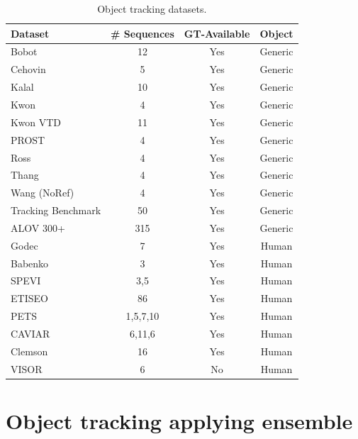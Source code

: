 \begin{table}[t!]
\centering
\begin{tabular}{lccc}
\toprule
\textbf{Dataset} & \textbf{\# Sequences} & \textbf{GT-Available} &
\textbf{Object} \\ \midrule
Bobot \cite{KleinIROS10}          & 12       & Yes & Generic \\
Cehovin \cite{Cehovin2013}        & 5        & Yes & Generic \\
Kalal \cite{Kalal2011}            & 10       & Yes & Generic \\
Kwon \cite{KwonL09}               & 4        & Yes & Generic \\
Kwon VTD \cite{KwonL10}           & 11       & Yes & Generic \\
PROST \cite{Santner2010a}         & 4        & Yes & Generic \\
Ross \cite{Ross2007}              & 4        & Yes & Generic \\
Thang \cite{Dinh2011}             & 4        & Yes & Generic \\
Wang (NoRef)                      & 4        & Yes & Generic \\
Tracking Benchmark \cite{Wu2013b} & 50       & Yes & Generic \\
ALOV 300+ \cite{Smeulders2014}    & 315      & Yes & Generic \\
Godec \cite{godec11a}             & 7        & Yes & Human   \\
Babenko \cite{Babenko2010}        & 3        & Yes & Human   \\
SPEVI \cite{Maggio2005}           & 3,5      & Yes & Human   \\
ETISEO \cite{Munder2006}          & 86       & Yes & Human   \\
PETS \cite{PETS}                  & 1,5,7,10 & Yes & Human   \\
CAVIAR \cite{Torralba2003}        & 6,11,6   & Yes & Human   \\
Clemson \cite{Birchfield1998}     & 16       & Yes & Human   \\
VISOR \cite{Vezzani2010}          & 6        & No  & Human   \\
\bottomrule
\end{tabular}
\caption{Object tracking datasets.}
\label{table:datasets}
\end{table}

\section{Object tracking applying ensemble}
\label{sec::ensemble}

